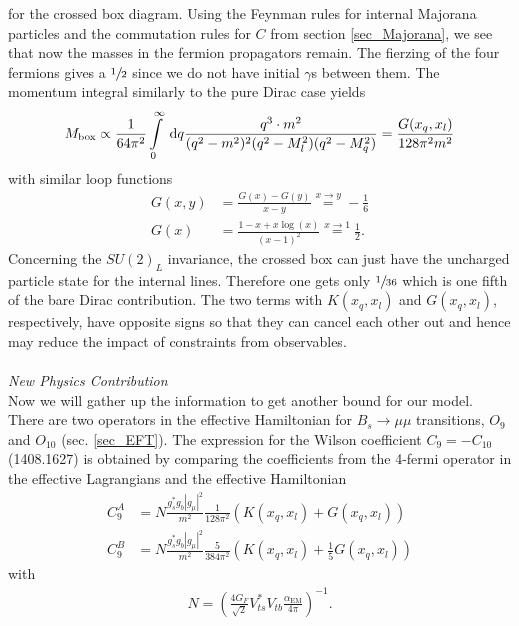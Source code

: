 for the crossed box diagram. Using the Feynman rules for internal Majorana particles and the commutation rules for $C$ from section \ref{sec_Majorana}, 
we see that now the masses in the fermion propagators remain. The fierzing of the four fermions gives a $\sfrac12$ since we do not have initial $\gamma$s
between them. The momentum integral similarly to the pure Dirac case yields
\begin{align}
 M_\text{box} \propto \frac{1}{64 \pi^2}\int\limits_0^\infty \; \mathrm{d} q \frac{q^3 \cdot m^2}{(q^2-m^2)^2(q^2-M_l^2)(q^2-M_q^2)} = \frac{G(x_q,x_l)}{128\pi^2m^2}
\end{align}
with similar loop functions
\begin{align}
 G(x,y) &= \frac{G(x)-G(y)}{x-y}\stackrel{x\rightarrow y}{=} -\frac16\\
 G(x)&=\frac{1-x+x\log(x)}{(x-1)^2} \stackrel{x\rightarrow 1}{=} \frac12.
\end{align}
Concerning the $SU(2)_L$ invariance, the crossed box can just have the uncharged particle state for the internal lines. Therefore one gets only $\sfrac{1}{36}$
which is one fifth of the bare Dirac contribution. The two terms with $K(x_q,x_l)$ and $G(x_q,x_l)$, respectively, have opposite signs so that they can cancel
each other out and hence may reduce the impact of constraints from observables.\\
\\ \textit{New Physics Contribution}\\
\noindent Now we will gather up the information to get another bound for our model. There are two operators in the effective Hamiltonian for $B_s\rightarrow \mu\mu$
transitions, $O_9$ and $O_{10}$ (sec. \ref{sec_EFT}). The expression for the Wilson coefficient $C_9 = -C_{10}$ (1408.1627) is obtained by comparing the coefficients from the 
4-fermi operator in the effective Lagrangians and the effective Hamiltonian
\begin{align}
 C_9^A &= N \frac{g_s^*g_b|g_\mu|^2}{m^2} \frac{1}{128\pi^2} \left(K(x_q,x_l) + G(x_q,x_l)\right)\\
 C_9^B &= N \frac{g_s^*g_b|g_\mu|^2}{m^2} \frac{5}{384\pi^2} \left(K(x_q,x_l) + \frac15 G(x_q,x_l)\right)
\end{align}
with
\begin{align}
 N = \left(\frac{4G_F}{\sqrt{2}} V_{ts}^*V_{tb} \frac{\alpha_\text{EM}}{4\pi}\right)^{-1}.
\end{align}


%  
